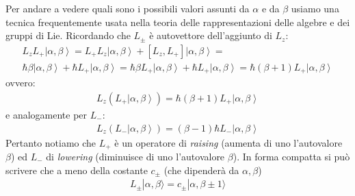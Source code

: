 Per andare a vedere quali sono i possibili valori assunti da $\alpha$ e da $\beta$ usiamo una tecnica frequentemente usata nella teoria delle rappresentazioni delle algebre e dei gruppi di Lie. 
Ricordando che $L_\pm$ è autovettore dell'aggiunto di $L_z$:
\begin{equation}\begin{split}
L_zL_+\left |\alpha,\beta \right\rangle=L_+L_z\left |\alpha,\beta \right\rangle+\left[L_z,L_+\right]\left |\alpha,\beta \right\rangle=\\
\hbar \beta\left |\alpha,\beta \right\rangle+\hbar L_+\left |\alpha,\beta \right\rangle=\hbar\beta L_+\left |\alpha,\beta \right\rangle+\hbar L_+\left |\alpha,\beta \right\rangle=
\hbar \left(\beta+1\right)L_+\left |\alpha,\beta \right\rangle
\end{split}\end{equation}
ovvero:
\begin{equation}\begin{split}
L_z\left(L_+\left |\alpha,\beta \right\rangle\right)=\hbar\left(\beta+1\right) L_+\left |\alpha,\beta \right\rangle
\end{split}\end{equation}
e analogamente per $L_-$:
\begin{equation}\begin{split}
L_z\left(L_-\left |\alpha,\beta \right\rangle\right)=\left(\beta-1\right)\hbar L_-\left |\alpha,\beta \right\rangle
\end{split}\end{equation}
Pertanto notiamo che $L_+$ è un operatore di \textit{raising} (aumenta di uno l'autovalore $\beta$) ed $L_-$ di \textit{lowering} (diminuisce di uno l'autovalore $\beta$).
In forma compatta si può scrivere che a meno della costante $c_\pm$ (che dipenderà da $\alpha,\beta$)
\begin{equation}\begin{split}
L_\pm|\alpha,\beta \rangle=c_\pm |\alpha,\beta\pm 1 \rangle
\end{split}\end{equation}
 

